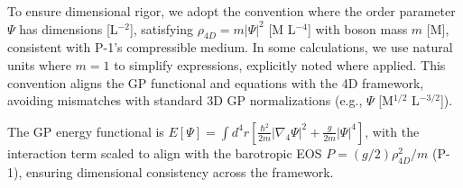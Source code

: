 To ensure dimensional rigor, we adopt the convention where the order parameter $\Psi$ has dimensions [L$^{-2}$], satisfying $\rho_{4D} = m |\Psi|^2$ [M L$^{-4}$] with boson mass $m$ [M], consistent with P-1's compressible medium. In some calculations, we use natural units where $m=1$ to simplify expressions, explicitly noted where applied. This convention aligns the GP functional and equations with the 4D framework, avoiding mismatches with standard 3D GP normalizations (e.g., $\Psi$ [M$^{1/2}$ L$^{-3/2}$]).

The GP energy functional is $E[\Psi] = \int d^4 r \left[ \frac{\hbar^2}{2 m} |\nabla_4 \Psi|^2 + \frac{g}{2m} |\Psi|^4 \right]$, with the interaction term scaled to align with the barotropic EOS $P = (g/2) \rho_{4D}^2 / m$ (P-1), ensuring dimensional consistency across the framework.

